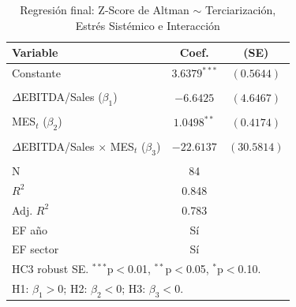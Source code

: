 \begin{table}[htbp]
\centering
\caption{Regresión final: Z-Score de Altman $\sim$ Terciarización, Estrés Sistémico e Interacción}
\label{tab:reg_final}
\begin{tabular}{lcc}
\toprule
\textbf{Variable} & \textbf{Coef.} & \textbf{(SE)} \\
\midrule
Constante & $3.6379^{***}$ & $(0.5644)$ \\
& & \\[-6pt]
$\Delta$EBITDA/Sales ($\beta_1$) & $-6.6425$ & $(4.6467)$ \\
& & \\[-6pt]
MES$_t$ ($\beta_2$) & $1.0498^{**}$ & $(0.4174)$ \\
& & \\[-6pt]
$\Delta$EBITDA/Sales $\times$ MES$_t$ ($\beta_3$) & $-22.6137$ & $(30.5814)$ \\
& & \\[-6pt]
\midrule
N & 84 & \\
$R^2$ & 0.848 & \\
Adj. $R^2$ & 0.783 & \\
EF año & Sí & \\
EF sector & Sí & \\
\bottomrule
\multicolumn{3}{l}{\footnotesize HC3 robust SE. $^{***}$p$<$0.01, $^{**}$p$<$0.05, $^{*}$p$<$0.10.} \\
\multicolumn{3}{l}{\footnotesize H1: $\beta_1>0$; H2: $\beta_2<0$; H3: $\beta_3<0$.} \\
\end{tabular}
\end{table}